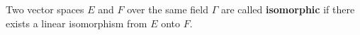 Two vector spaces $E$ and $F$ over the same field $\Gamma$ are called \textbf{isomorphic} if there exists a linear isomorphism from $E$ onto $F$.
